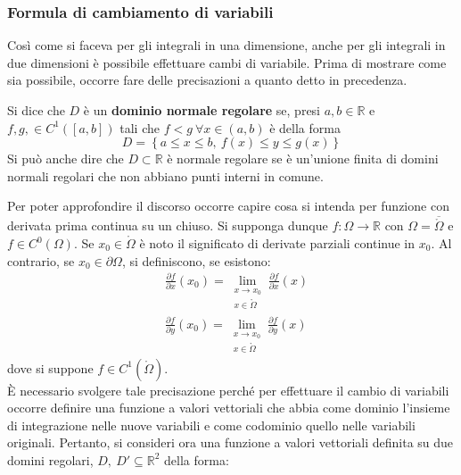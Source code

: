 \subsubsection{Formula di cambiamento di variabili}
Così come si faceva per gli integrali in una dimensione, anche per gli integrali in due dimensioni è possibile effettuare cambi di variabile. Prima di mostrare come sia possibile, occorre fare delle precisazioni a quanto detto in precedenza.
\begin{definition} \label{Def: Dominio regolare}
    Si dice che $D$ è un \textbf{dominio normale regolare} se, presi $a,b \in \mathbb{R}$ e $f,g, \in C^1([a,b])$ tali che $f < g\ \forall x \in (a,b)$ è della forma
    \begin{equation}
        D= \left\{a \leq x \leq b, \ f(x) \leq y \leq g(x) \right\}
    \end{equation}
    Si può anche dire che $D \subset \mathbb{R}$ è normale regolare se è un'unione finita di domini normali regolari che non abbiano punti interni in comune.
    \end{definition}
    \vspace*{6pt}
Per poter approfondire il discorso occorre capire cosa si intenda per funzione con derivata prima continua su un chiuso. Si supponga dunque $f: \Omega \to \mathbb{R}$ con $\Omega = \overline{\mathring{\Omega}}$ e $f \in C^0(\Omega)$. Se $x_0 \in \mathring{\Omega}$ è noto il significato di derivate parziali continue in $x_0$. Al contrario, se $x_0 \in \partial \Omega$, si definiscono, se esistono:
\begin{equation}
\begin{aligned}
    &\frac{\partial{f}}{\partial{x}}(x_0)= \lim_{\substack{x \to x_0 \\ x \in \mathring{\Omega}}} \frac{\partial f}{\partial x}(x)\\
    &\frac{\partial{f}}{\partial{y}}(x_0)= \lim_{\substack{x \to x_0 \\ x \in \mathring{\Omega}}} \frac{\partial f}{\partial y}(x)
\end{aligned}
\end{equation}
dove si suppone $f \in C^1(\mathring{\Omega})$.\\
È necessario svolgere tale precisazione perché per effettuare il cambio di variabili occorre definire una funzione a valori vettoriali che abbia come dominio l'insieme di integrazione nelle nuove variabili e come codominio quello nelle variabili originali. Pertanto, si consideri ora una funzione a valori vettoriali definita su due domini regolari, $D,\ D' \subseteq \mathbb{R}^2$ della forma:
